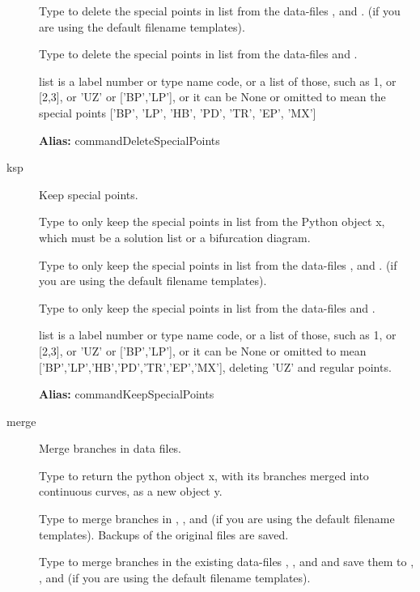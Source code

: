 \documentclass[12pt]{report}
\begin{document}
\begin{description}
    Type  to delete the special points in list from
    the data-files , and .
    (if you are using the default filename templates).

    Type  to delete the special points in list from
    the data-files  and .

    list is a label number or type name code, or a list of those,
    such as 1, or [2,3], or 'UZ' or ['BP','LP'], or it can be None or
    omitted to mean the special points ['BP', 'LP', 'HB', 'PD', 'TR', 'EP',
    'MX']

\textbf{Alias:} commandDeleteSpecialPoints

\item[ksp]
Keep special points.

    Type  to only keep the special points in list from
    the Python object x, which must be a solution list or a bifurcation diagram.

    Type  to only keep the special points in list from
    the data-files , and .
    (if you are using the default filename templates).

    Type  to only keep the special points in list from
    the data-files  and .

    list is a label number or type name code, or a list of those,
    such as 1, or [2,3], or 'UZ' or ['BP','LP'], or it can be None or
    omitted to mean ['BP','LP','HB','PD','TR','EP','MX'], deleting 'UZ' and
    regular points.

\textbf{Alias:} commandKeepSpecialPoints

\item[merge]
Merge branches in data files.

    Type  to return the python object x, with its branches
    merged into continuous curves, as a new object y.

    Type  to merge branches in ,
    , and  (if you are
    using the default filename templates).  Backups of the
    original files are saved.

    Type  to merge branches in the existing data-files
    , , and  and save them to 
    , , and  (if you
    are using the default filename templates). 


\end{description}
\end{document}
